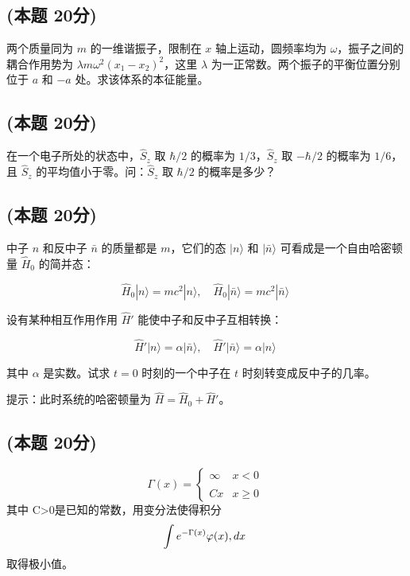 \subsection{(本题 20分)}
两个质量同为 $m$ 的一维谐振子，限制在 $x$ 轴上运动，圆频率均为 $\omega$，振子之间的耦合作用势为 $\lambda m \omega^2 (x_1 - x_2)^2$，这里 $\lambda$ 为一正常数。两个振子的平衡位置分别位于 $a$ 和 $-a$ 处。求该体系的本征能量。
\subsection{(本题 20分)}
在一个电子所处的状态中，$\hat S_z$ 取 $\hbar/2$ 的概率为 $1/3$，$\hat S_z$ 取 $-\hbar/2$ 的概率为 $1/6$，且 $\hat S_z$ 的平均值小于零。问：$\hat S_z$ 取 $\hbar/2$ 的概率是多少？
\subsection{(本题 20分)}
中子 $n$ 和反中子 $\bar{n}$ 的质量都是 $m$，它们的态 $|n\rangle$ 和 $|\bar{n}\rangle$ 可看成是一个自由哈密顿量 $\hat H_0$ 的简并态：

$$\hat H_0|n\rangle = mc^2|n\rangle, \quad \hat H_0|\bar{n}\rangle = mc^2|\bar{n}\rangle~$$

设有某种相互作用作用 $\hat H'$ 能使中子和反中子互相转换：

$$\hat H'|n\rangle = \alpha|\bar{n}\rangle, \quad \hat H'|\bar{n}\rangle = \alpha|n\rangle~$$

其中 $\alpha$ 是实数。试求 $t=0$ 时刻的一个中子在 $t$ 时刻转变成反中子的几率。

提示：此时系统的哈密顿量为 $\hat{H} = \hat{H}_0 + \hat{H}'$。
\subsection{(本题 20分)}
$$\Gamma(x) = \begin{cases} \infty & x < 0 \\\\ Cx & x \geq 0\end{cases}~$$
其中 C>0是已知的常数，用变分法使得积分
$$\int e^{-\Gamma(x)} \varphi(x) \\, dx~$$
取得极小值。
